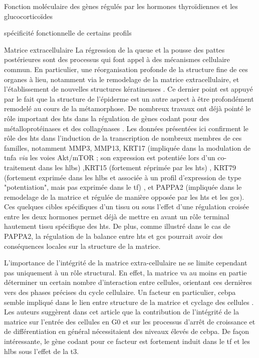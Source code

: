 \documentclass[../main.tex]{subfiles}
\begin{document}
\begin{chapter}{Fonction moléculaire des gènes régulés par les hormones thyroïdiennes et les glucocorticoïdes}
\begin{section}{spécificité fonctionnelle de certains profils}
\begin{subsection}{Matrice extracellulaire}
La régression de la queue et la pousse des pattes postérieures sont des processus qui font appel à des mécanismes cellulaire commun.
En particulier, une réorganisation profonde de la structure fine de ces organes à lieu, notamment via le remodelage de la matrice extracellulaire, et l'établissement de nouvelles structures kératineuses \citep{Schreiber2003}.
Ce dernier point est appuyé par le fait que la structure de l'épiderme est un autre aspect à être profondément remodelé au cours de la métamorphose.
De nombreux travaux ont déjà pointé le rôle important des \glspl{ht} dans la régulation de gènes codant pour des métalloprotéinases et des collagénases \citep{Jung2004,Fu2007}.
Les données présentées ici confirment le rôle des \glspl{ht} dans l'induction de la transcription de nombreux membres de ces familles, notamment MMP3, MMP13, KRT17 (impliquée dans la modulation de \gls{tnfa} \textit{via} les voies Akt/mTOR ; son expression est potentiée lors d'un co-traitement dans les \glspl{hlb})
,KRT15 (fortement réprimée par les \glspl{ht})
, KRT79 (fortement exprimée dans les \glspl{hlb} et associée à un profil d'expression de type "potentiation", mais pas exprimée dans le \gls{tf})
, et PAPPA2 (impliquée dans le remodelage de la matrice et régulée de manière opposée par les \glspl{ht} et les \glspl{gc}).
Ces quelques cibles spécifiques d'un tissu ou sous l'effet d'une régulation croisée entre les deux hormones permet déjà de mettre en avant un rôle terminal hautement tissu spécifique des \glspl{ht}.
De plus, comme illustré dans le cas de PAPPA2, la régulation de la balance entre \glspl{ht} et \glspl{gc} pourrait avoir des conséquences locales sur la structure de la matrice.
\par
L'importance de l'intégrité de la matrice extra-cellulaire ne se limite cependant pas uniquement à un rôle structural.
En effet, la matrice va au moins en partie déterminer un certain nombre d'interaction entre cellules, orientant ces dernières vers des phases précises du cycle cellulaire.
Un facteur en particulier, \gls{cebpa} semble impliqué dans le lien entre structure de la matrice et cyclage des cellules \citep{Rana1994}.
Les auteurs suggèrent dans cet article que la contribution de l'intégrité de la matrice sur l'entrée des cellules en G0 et sur les processus d’arrêt de croissance et de différentiation en général nécessitaient des niveaux élevés de \gls{cebpa}.
De façon intéressante, le gène codant pour ce facteur est fortement induit dans le \gls{tf} et les \glspl{hlb} sous l'effet de la \gls{t3}.

\end{subsection}
\end{section}
\end{chapter}
\end{document}
